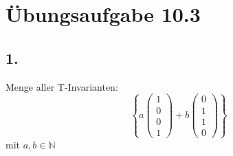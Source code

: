 \documentclass[a4paper,12pt]{scrartcl}
\begin{document}
\section{Übungsaufgabe 10.3}

\subsection{1.}
Menge aller T-Invarianten:
\[
	\left\{ a \begin{pmatrix} 1 \\ 0 \\ 0 \\ 1 \end{pmatrix} +
		    b \begin{pmatrix} 0 \\ 1 \\ 1 \\ 0 \end{pmatrix} \right\}
\]
mit \(a, b \in \mathbb{N}\)
\end{document}
